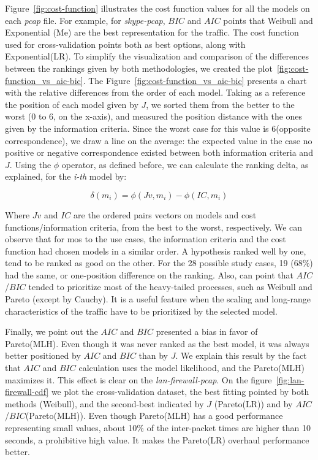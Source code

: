 Figure~\ref{fig:cost-function} illustrates the cost function values for all the models on each \textit{pcap} file. For example, for \textit{skype-pcap}, $BIC$ and $AIC$ points that  Weibull and Exponential (Me) are the best representation for the traffic. The cost function used for cross-validation points both as best options, along with Exponential(LR).  To simplify the visualization and comparison of the differences between the rankings given by both methodologies, we created the plot~\ref{fig:cost-function_vs_aic-bic}.
The Figure~\ref{fig:cost-function_vs_aic-bic} presents a chart with the relative differences from the order of each model. Taking as a reference the position of each model given by $J$, we sorted them from the better to the worst (0 to 6, on the x-axis), and measured the position distance with the ones given by the information criteria. Since the worst case for this value is 6(opposite correspondence), we draw a line on the average: the expected value in the case no positive or negative correspondence existed between both information criteria and $J$. Using the $\phi$ operator, as defined before, we can calculate the ranking delta, as explained, for the \textit{i-th} model by:

\begin{equation}
\delta(m_i) = \phi(Jv, m_i) - \phi(IC, m_i)
\end{equation}

Where $Jv$ and $IC$ are the ordered pairs vectors on models and cost functions/information criteria, from the best to the worst, respectively.  We can observe that for mos to the use cases, the information criteria and the cost function had chosen models in a similar order. A hypothesis ranked well by one, tend to be ranked as good on the other. For the 28 possible study cases, 19 (68\%) had the same, or one-position difference on the ranking. 
Also, can point that $AIC$/$BIC$ tended to prioritize most of the heavy-tailed processes, such as Weibull and Pareto (except by Cauchy). It is a useful feature when the scaling and long-range characteristics of the traffic have to be prioritized by the selected model. 

Finally, we point out the $AIC$ and $BIC$ presented a bias in favor of Pareto(MLH). Even though it was never ranked as the best model, it was always better positioned by $AIC$ and $BIC$ than by $J$. We explain this result by the fact that $AIC$ and $BIC$ calculation uses the model likelihood, and the  Pareto(MLH) maximizes it.  This effect is clear on the \textit{lan-firewall-pcap}. On the figure~\ref{fig:lan-firewall-cdf} we plot the cross-validation dataset, the best fitting pointed by both methods (Weibull), and the second-best indicated by $J$ (Pareto(LR)) and by $AIC$/$BIC$(Pareto(MLH)). Even though Pareto(MLH) has a good performance representing small values, about 10\% of the inter-packet times are higher than 10 seconds, a prohibitive high value. It makes the Pareto(LR) overhaul performance better.


